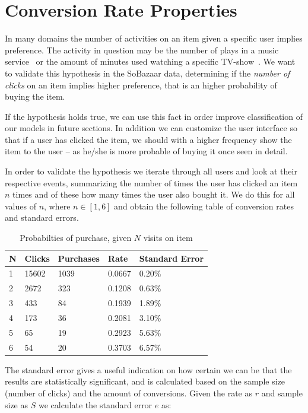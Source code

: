 \section{Conversion Rate Properties}
\label{sec:conv-rate}

In many domains the number of activities on an item given a specific user
implies preference. The activity in question may be the number of plays in a
music service~\cite{parra2011walk} or the amount of minutes used watching a
specific TV-show~\cite{study-on-implicit-tv}. We want to validate this
hypothesis in the SoBazaar data, determining if the \textit{number of clicks}
on an item implies higher preference, that is an higher probability of buying
the item.

If the hypothesis holds true, we can use this fact in order improve
classification of our models in future sections. In addition we can customize
the user interface so that if a user has clicked the item, we should with a
higher frequency show the item to the user -- as he/she is more probable of
buying it once seen in detail.

In order to validate the hypothesis we iterate through all users and look at
their respective events, summarizing the number of times the user has clicked
an item $n$ times and of these how many times the user also bought it. We do
this for all values of $n$, where $n \in [1,6]$ and obtain the following table
of conversion rates and standard errors.

\begin{table}[H]
  \centering
  \begin{tabular}{lllll}
    \toprule
    N & Clicks & Purchases & Rate & Standard Error \\
    \midrule
    1 & 15602 & 1039  & 0.0667 & 0.20\% \\
    2 & 2672  & 323   & 0.1208 & 0.63\% \\
    3 & 433   & 84    & 0.1939 & 1.89\% \\
    4 & 173   & 36    & 0.2081 & 3.10\% \\
    5 & 65    & 19    & 0.2923 & 5.63\% \\
    6 & 54    & 20    & 0.3703 & 6.57\% \\
    \bottomrule
  \end{tabular}
  \label{tab:prob-purchase}
  \caption{Probabilties of purchase, given $N$ visits on item}
\end{table}

The standard error gives a useful indication on how certain we can be that the
results are statistically significant, and is calculated based on the sample
size (number of clicks) and the amount of conversions. Given the rate as $r$
and sample size as $S$ we calculate the standard error $e$ as:

